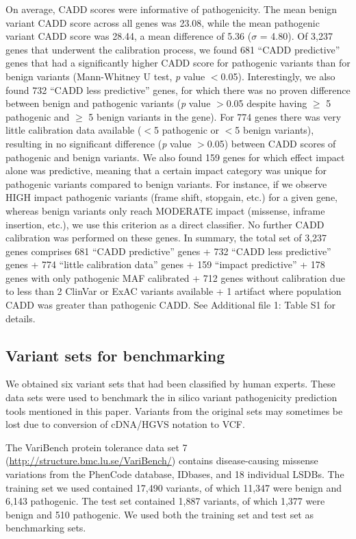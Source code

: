 On average, CADD scores were informative of pathogenicity.
The mean benign variant CADD score across all genes was 23.08, while the mean pathogenic variant CADD score was 28.44, a mean difference of 5.36 ($\sigma$ = 4.80).
Of 3,237 genes that underwent the calibration process, we found 681 “CADD predictive” genes that had a significantly higher CADD score for pathogenic variants than for benign variants (Mann-Whitney U test, \textsl{p} value $<$0.05).
Interestingly, we also found 732 “CADD less predictive” genes, for which there was no proven difference between benign and pathogenic variants (\textsl{p} value $>$0.05 despite having $\geq$ 5 pathogenic and $\geq$ 5 benign variants in the gene).
For 774 genes there was very little calibration data available ($<$5 pathogenic or $<$5 benign variants), resulting in no significant difference (\textsl{p} value $>$0.05) between CADD scores of pathogenic and benign variants.
We also found 159 genes for which effect impact alone was predictive, meaning that a certain impact category was unique for pathogenic variants compared to benign variants.
For instance, if we observe HIGH impact pathogenic variants (frame shift, stopgain, etc.) for a given gene, whereas benign variants only reach MODERATE impact (missense, inframe insertion, etc.), we use this criterion as a direct classifier.
No further CADD calibration was performed on these genes.
In summary, the total set of 3,237 genes comprises 681 “CADD predictive” genes + 732 “CADD less predictive” genes + 774 “little calibration data” genes + 159 “impact predictive” + 178 genes with only pathogenic MAF calibrated + 712 genes without calibration due to less than 2 ClinVar or ExAC variants available + 1 artifact where population CADD was greater than pathogenic CADD.
See Additional file 1: Table S1 for details.

\subsection{Variant sets for benchmarking}
We obtained six variant sets that had been classified by human experts.
These data sets were used to benchmark the in silico variant pathogenicity prediction tools mentioned in this paper.
Variants from the original sets may sometimes be lost due to conversion of cDNA/HGVS notation to VCF.

The VariBench protein tolerance data set 7 (\url{http://structure.bmc.lu.se/VariBench/}) contains disease-causing missense variations from the PhenCode\cite{Giardine_2007} database, IDbases\cite{Piiril__2006}, and 18 individual LSDBs\cite{Nair_2012}.
The training set we used contained 17,490 variants, of which 11,347 were benign and 6,143 pathogenic.
The test set contained 1,887 variants, of which 1,377 were benign and 510 pathogenic.
We used both the training set and test set as benchmarking sets.

